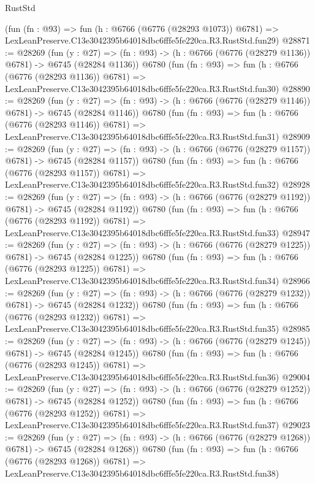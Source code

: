 \begin{lexlean}{RustStd}
\begin{coremodule}
    (fun (fn : @93) =>
    fun (h : @6766 (@6776 (@28293 @1073)) @6781) =>
    LexLeanPreserve.C13e3042395b64018dbc6fffe5fe220ca.R3.RustStd.fun29)
@28871 := @28269
    (fun (y : @27) =>
    (fn : @93) -> (h : @6766 (@6776 (@28279 @1136)) @6781) -> @6745 (@28284 @1136))
    @6780
    (fun (fn : @93) =>
    fun (h : @6766 (@6776 (@28293 @1136)) @6781) =>
    LexLeanPreserve.C13e3042395b64018dbc6fffe5fe220ca.R3.RustStd.fun30)
@28890 := @28269
    (fun (y : @27) =>
    (fn : @93) -> (h : @6766 (@6776 (@28279 @1146)) @6781) -> @6745 (@28284 @1146))
    @6780
    (fun (fn : @93) =>
    fun (h : @6766 (@6776 (@28293 @1146)) @6781) =>
    LexLeanPreserve.C13e3042395b64018dbc6fffe5fe220ca.R3.RustStd.fun31)
@28909 := @28269
    (fun (y : @27) =>
    (fn : @93) -> (h : @6766 (@6776 (@28279 @1157)) @6781) -> @6745 (@28284 @1157))
    @6780
    (fun (fn : @93) =>
    fun (h : @6766 (@6776 (@28293 @1157)) @6781) =>
    LexLeanPreserve.C13e3042395b64018dbc6fffe5fe220ca.R3.RustStd.fun32)
@28928 := @28269
    (fun (y : @27) =>
    (fn : @93) -> (h : @6766 (@6776 (@28279 @1192)) @6781) -> @6745 (@28284 @1192))
    @6780
    (fun (fn : @93) =>
    fun (h : @6766 (@6776 (@28293 @1192)) @6781) =>
    LexLeanPreserve.C13e3042395b64018dbc6fffe5fe220ca.R3.RustStd.fun33)
@28947 := @28269
    (fun (y : @27) =>
    (fn : @93) -> (h : @6766 (@6776 (@28279 @1225)) @6781) -> @6745 (@28284 @1225))
    @6780
    (fun (fn : @93) =>
    fun (h : @6766 (@6776 (@28293 @1225)) @6781) =>
    LexLeanPreserve.C13e3042395b64018dbc6fffe5fe220ca.R3.RustStd.fun34)
@28966 := @28269
    (fun (y : @27) =>
    (fn : @93) -> (h : @6766 (@6776 (@28279 @1232)) @6781) -> @6745 (@28284 @1232))
    @6780
    (fun (fn : @93) =>
    fun (h : @6766 (@6776 (@28293 @1232)) @6781) =>
    LexLeanPreserve.C13e3042395b64018dbc6fffe5fe220ca.R3.RustStd.fun35)
@28985 := @28269
    (fun (y : @27) =>
    (fn : @93) -> (h : @6766 (@6776 (@28279 @1245)) @6781) -> @6745 (@28284 @1245))
    @6780
    (fun (fn : @93) =>
    fun (h : @6766 (@6776 (@28293 @1245)) @6781) =>
    LexLeanPreserve.C13e3042395b64018dbc6fffe5fe220ca.R3.RustStd.fun36)
@29004 := @28269
    (fun (y : @27) =>
    (fn : @93) -> (h : @6766 (@6776 (@28279 @1252)) @6781) -> @6745 (@28284 @1252))
    @6780
    (fun (fn : @93) =>
    fun (h : @6766 (@6776 (@28293 @1252)) @6781) =>
    LexLeanPreserve.C13e3042395b64018dbc6fffe5fe220ca.R3.RustStd.fun37)
@29023 := @28269
    (fun (y : @27) =>
    (fn : @93) -> (h : @6766 (@6776 (@28279 @1268)) @6781) -> @6745 (@28284 @1268))
    @6780
    (fun (fn : @93) =>
    fun (h : @6766 (@6776 (@28293 @1268)) @6781) =>
    LexLeanPreserve.C13e3042395b64018dbc6fffe5fe220ca.R3.RustStd.fun38)

\end{coremodule}
\end{lexlean}
